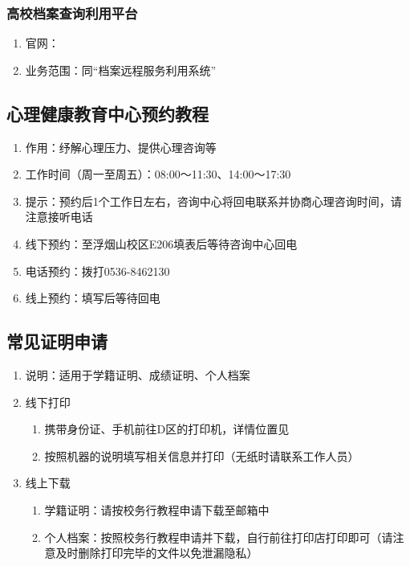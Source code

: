 \subsubsection[高校档案查询利用平台]{高校档案查询利用平台}
\begin{enumerate}
    \item 官网：
    \item 业务范围：同“档案远程服务利用系统”
\end{enumerate}

\subsection[心理健康教育中心预约教程]{心理健康教育中心预约教程}
\begin{enumerate}
    \item 作用：纾解心理压力、提供心理咨询等
    \item 工作时间（周一至周五）：08:00～11:30、14:00～17:30
    \item 提示：预约后1个工作日左右，咨询中心将回电联系并协商心理咨询时间，请注意接听电话
    \item 线下预约：至浮烟山校区E206填表后等待咨询中心回电
    \item 电话预约：拨打0536-8462130
    \item 线上预约：填写后等待回电

\end{enumerate}

\subsection[常见证明申请]{常见证明申请}
\begin{enumerate}
    \item 说明：适用于学籍证明\footnotemark、成绩证明、个人档案
    \item 线下打印
          \begin{enumerate}
              \item 携带身份证、手机前往D区的打印机，详情位置见
              \item 按照机器的说明填写相关信息并打印（无纸时请联系工作人员）
          \end{enumerate}
    \item 线上下载
          \begin{enumerate}
              \item 学籍证明：请按校务行教程申请下载至邮箱中
              \item 个人档案：按照校务行教程申请并下载，自行前往打印店打印即可（请注意及时删除打印完毕的文件以免泄漏隐私）
          \end{enumerate}
\end{enumerate}

